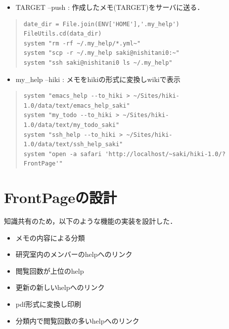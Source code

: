 \documentclass[10pt,a4j,twocolumn]{jsarticle}
\begin{document}
\begin{itemize}
\item TARGET --push : 作成したメモ(TARGET)をサーバに送る．
\end{itemize}\begin{quote}\begin{verbatim}
date_dir = File.join(ENV['HOME'],'.my_help')
FileUtils.cd(data_dir)
system "rm -rf ~/.my_help/*.yml~"
system "scp -r ~/.my_help saki@nishitani0:~"
system "ssh saki@nishitani0 ls ~/.my_help"
\end{verbatim}\end{quote}
\begin{itemize}
\item my\_help --hiki : メモをhikiの形式に変換しwikiで表示
\end{itemize}\begin{quote}\begin{verbatim}
system "emacs_help --to_hiki > ~/Sites/hiki-1.0/data/text/emacs_help_saki"
system "my_todo --to_hiki > ~/Sites/hiki-1.0/data/text/my_todo_saki"
system "ssh_help --to_hiki > ~/Sites/hiki-1.0/data/text/ssh_help_saki"
system "open -a safari 'http://localhost/~saki/hiki-1.0/?FrontPage'"
\end{verbatim}\end{quote}
\section{FrontPageの設計}
知識共有のため，以下のような機能の実装を設計した．

\begin{itemize}
\item メモの内容による分類
\item 研究室内のメンバーのhelpへのリンク
\item 閲覧回数が上位のhelp
\item 更新の新しいhelpへのリンク
\item pdf形式に変換し印刷
\item 分類内で閲覧回数の多いhelpへのリンク
\end{itemize}
\end{document}
